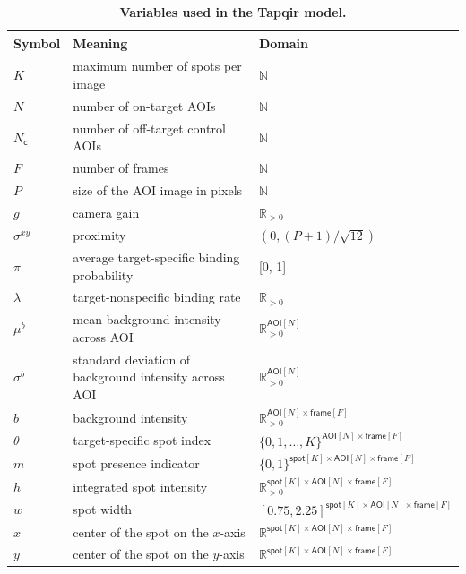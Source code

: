 \begin{table}[h]
\caption{\label{tab:parameters} \textbf{Variables used in the Tapqir model.}}
\begin{tabular}{l l l}
\toprule
Symbol & Meaning & Domain \\
\midrule
$K$ & maximum number of spots per image & $\mathbb{N}$ \\
$N$ & number of on-target AOIs & $\mathbb{N}$ \rule{0pt}{3ex} \\
$N_\mathsf{c}$ & number of off-target control AOIs & $\mathbb{N}$ \rule{0pt}{3ex} \\
$F$ & number of frames & $\mathbb{N}$ \rule{0pt}{3ex} \\
$P$ & size of the AOI image in pixels & $\mathbb{N}$ \rule{0pt}{3ex} \\
$g$ & camera gain & $\mathbb{R}_{>0}$ \rule{0pt}{3ex} \\
$\sigma^{xy}$ & proximity & $(0, (P+1)/\sqrt{12})$ \rule{0pt}{3ex} \\
$\pi$ & average target-specific binding probability & [0, 1] \rule{0pt}{3ex} \\
$\lambda$ & target-nonspecific binding rate & $\mathbb{R}_{>0}$ \rule{0pt}{3ex} \\
$\mu^b$ & mean background intensity across AOI & $\mathbb{R}_{>0}^{\mathsf{AOI}[N]}$ \rule{0pt}{3ex} \\
$\sigma^b$ & standard deviation of background intensity across AOI & $\mathbb{R}_{>0}^{\mathsf{AOI}[N]}$ \rule{0pt}{3ex} \\
$b$ & background intensity & $\mathbb{R}_{>0}^{\mathsf{AOI}[N] \times \mathsf{frame}[F]}$ \rule{0pt}{3ex} \\
$\theta$ & target-specific spot index & $\{0, 1, \dots, K \}^{\mathsf{AOI}[N] \times \mathsf{frame}[F]}$ \rule{0pt}{3ex} \\
$m$ & spot presence indicator & $\{ 0, 1 \}^{\mathsf{spot}[K] \times \mathsf{AOI}[N] \times \mathsf{frame}[F]}$ \rule{0pt}{3ex} \\
$h$ & integrated spot intensity & $\mathbb{R}_{>0}^{\mathsf{spot}[K] \times \mathsf{AOI}[N] \times \mathsf{frame}[F]}$ \rule{0pt}{3ex} \\
$w$ & spot width & $[0.75, 2.25]^{\mathsf{spot}[K] \times \mathsf{AOI}[N] \times \mathsf{frame}[F]}$ \rule{0pt}{3ex} \\
$x$ & center of the spot on the $x$-axis & $\mathbb{R}^{\mathsf{spot}[K] \times \mathsf{AOI}[N] \times \mathsf{frame}[F]}$ \rule{0pt}{3ex} \\
$y$ & center of the spot on the $y$-axis & $\mathbb{R}^{\mathsf{spot}[K] \times \mathsf{AOI}[N] \times \mathsf{frame}[F]}$ \rule{0pt}{3ex} \\

\end{tabular}
\end{table}
